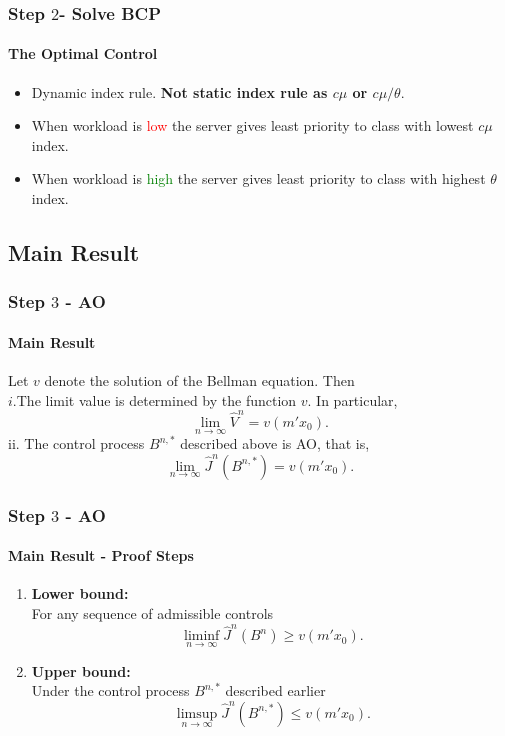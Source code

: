 \documentclass{beamer}
\newcommand{\iy}{\infty}
\begin{document}
\begin{frame}
  \frametitle{Step $2$- Solve BCP}
  \framesubtitle{The Optimal Control}

  \vfill
  \begin{itemize}[<+->]
  \item Dynamic index rule. {\bf Not static index rule as $c\mu$ or $c\mu/\theta$}.
    \vfill
  \item When workload is \textcolor{red}{low} the server gives least priority to class with lowest $c\mu$ index.
    \vfill
  \item When workload is \textcolor{green}{high} the server gives least priority to class with highest $\theta$ index.
  \end{itemize}
  \vfill



\end{frame}



\subsection{Main Result}
\begin{frame}
  \frametitle{Step $3$ - AO}
  \framesubtitle{Main Result}

  
  \begin{theorem}
    \label{th1}
    Let $v$ denote the solution of the Bellman equation. Then\\
    $i$.The limit value is determined by the function $v$. In particular,
    \[
    \lim_{n\to\iy}\hat V^n= v(m'x_0).
    \]
    ii. The control process $B^{n,*}$ described above is AO, that is,
    \[
    \lim_{n\to\iy}\hat J^n(B^{n,*})= v(m'x_0).
    \]
  \end{theorem}

\end{frame}





\begin{frame}
  \frametitle{Step $3$ - AO}
  \framesubtitle{Main Result - Proof Steps}

  \vfill
  \vfill 
  \begin{enumerate}[<+->]%
  \item {\bf Lower bound:}\\
    For any sequence of admissible controls
    \[
    \liminf_{n \to \infty} \hat{J}^n(B^n)\ge v(m'x_0).
    \]
    \vfill
  \item {\bf Upper bound:}\\
    Under the control process $B^{n,*}$ described earlier
    \[
    \limsup_{n \to \infty} \hat{J}^n(B^{n,*})\le v(m'x_0).
    \]
    
  \end{enumerate}
  \vfill  

\end{frame}
\end{document}

